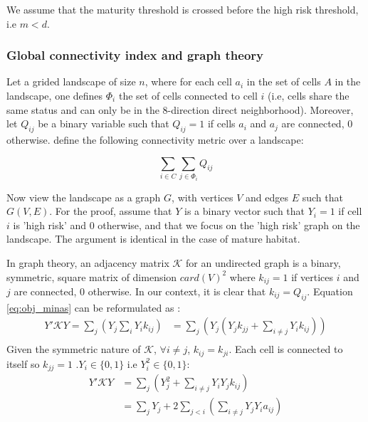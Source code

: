 We assume that the maturity threshold is crossed before the high risk threshold, i.e $m<d$.

\subsubsection{Global connectivity index and graph theory}
\label{sec:connectivity}
Let a grided landscape of size $n$, where for each cell $a_i$ in the set of cells $A$ in the landscape, one defines $\Phi_i$ the set of cells connected to cell $i$ (i.e, cells share the same status and can only be in the 8-direction direct neighborhood). Moreover, let $Q_{ij}$ be a binary variable such that $Q_{ij}=1$ if cells $a_i$ and $a_j$ are connected, $0$ otherwise. \cite{minas_spatial_2014} define the following connectivity metric over a landscape: 

\begin{equation}
    \sum_{i \in C}\sum_{j \in \Phi_i}Q_{ij}
    \label{eq:obj_minas}
\end{equation}


Now view the landscape as a graph $G$, with vertices $V$ and edges $E$ such that $G(V,E)$. For the proof, assume that $Y$ is a binary vector such that $Y_i=1$ if cell $i$ is 'high risk' and $0$ otherwise, and that we focus on the 'high risk' graph on the landscape. The argument is identical in the case of mature habitat. 

In graph theory, an adjacency matrix $\mathcal{K}$ for an undirected graph is a binary, symmetric, square matrix of dimension $card(V)^2$ where $k_{ij}=1$ if vertices $i$ and $j$ are connected, $0$ otherwise. In our context, it is clear that $k_{ij}=Q_{ij}$. Equation \ref{eq:obj_minas} can be reformulated as : 
\begin{align*}
    Y' \mathcal{K} Y = \sum_j\left( Y_j \sum_i Y_i k_{ij}\right)
           &= \sum_j\left( Y_j \left( Y_j k_{jj} + \sum_{i \neq j}Y_i k_{ij}\right)\right) \\
\end{align*}
Given the symmetric nature of $\mathcal{K}$, $\forall i \neq j$, $k_{ij}=k_{ji}$. Each cell is connected to itself so $k_{jj}=1$ .$Y_i\in\{0,1\}$ i.e $Y_i^2 \in \{0,1\}$:
\begin{align*}
    Y'\mathcal{K} Y & =\sum_j \left(Y_j^2 + \sum_{i\neq j}Y_i Y_j k_{ij}\right)\\ 
          & = \sum_j Y_j + 2 \sum_{j<i} \left(\sum_{i \neq j }Y_j Y_i a_{ij}\right)
\end{align*}

